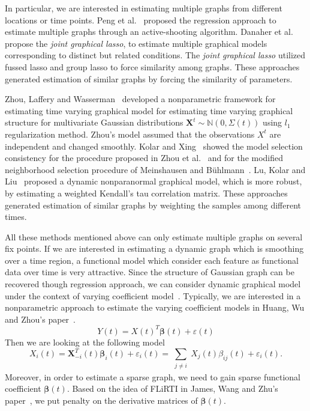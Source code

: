 \documentclass[11pt]{article}
\newcommand{\N}{\mathbb N}
\newcommand{\bX}{\mathbf X}
\newcommand{\bbeta}{{\boldsymbol{\beta}}}
\begin{document}
In particular, we are interested in estimating multiple graphs from different locations or time points. Peng et al.~\cite{peng2012partial} proposed the regression approach to estimate multiple graphs through an active-shooting algorithm. Danaher et al.~\cite{danaher2014joint} propose the \emph{joint graphical lasso}, to estimate multiple graphical models corresponding to distinct but related conditions. The \emph{joint graphical lasso} utilized fussed lasso and group lasso to force similarity among graphs. These approaches generated estimation of similar graphs by forcing the similarity of parameters.

Zhou, Laffery and Wasserman~\cite{zhou2010time} developed a nonparametric framework for estimating time varying graphical model for estimating time varying graphical structure for multivariate Gaussian distributions $\bX^t \sim \N(0, \Sigma(t))$ using $ l_1 $ regularization method. Zhou's model assumed that the observations $X^t$ are independent and changed smoothly. Kolar and Xing~\cite{kolar2011time} showed the model selection consistency for the procedure proposed in Zhou et al.~\cite{zhou2010time} and for the modified neighborhood selection procedure of Meinshausen and B{\"u}hlmann~\cite{meinshausen2006high}. Lu, Kolar and Liu~\cite{lu2015post} proposed a dynamic nonparanormal graphical model, which is more robust, by estimating a weighted Kendall's tau correlation matrix. These approaches generated estimation of similar graphs by weighting the samples among different times.

All these methods mentioned above can only estimate multiple graphs on several fix points. If we are interested in estimating a dynamic graph which is smoothing over a time region, a functional model which consider each feature as functional data over time is very attractive. Since the structure of Gaussian graph can be recovered though regression approach, we can consider dynamic graphical model under the context of varying coefficient model~\cite{hastie1993varying, fan1999statistical, fan2008statistical}. Typically, we are interested in a nonparametric approach to estimate the varying coefficient models in Huang, Wu and Zhou's paper~\cite{huang2002varying}. 
$$ Y(t) = X(t)^T \bbeta(t) + \varepsilon(t) $$
Then we are looking at the following model
$$ X_i(t) = \bX_{-i}^T(t) \bbeta_i(t) + \varepsilon_i(t) = \sum_{\substack{j\neq i}} X_j(t) \beta_{ij}(t) + \varepsilon_i(t). $$
Moreover, in order to estimate a sparse graph, we need to gain sparse functional coefficient $\bbeta(t)$. Based on the idea of FLiRTI in James, Wang and Zhu's paper~\cite{james2009functional}, we put penalty on the derivative matrices of $\bbeta(t)$.  
\end{document}
